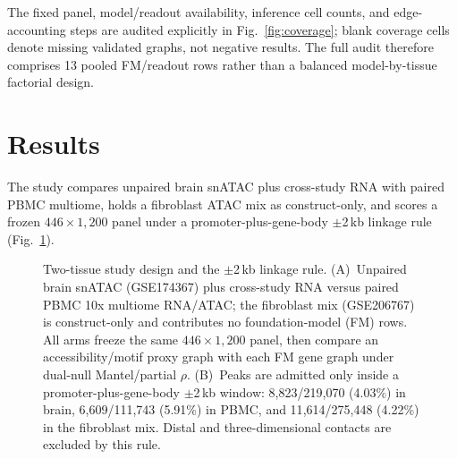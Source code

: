 \documentclass[fleqn,10pt,lineno]{wlpeerj}
\newcommand{\fitfig}[1]{\resizebox{\ifdim\width>\linewidth\linewidth\else\width\fi}{!}{#1}}
\begin{document}
The fixed panel, model/readout availability, inference cell counts, and edge-accounting
steps are audited explicitly in Fig.~\ref{fig:coverage}; blank coverage cells denote missing
validated graphs, not negative results. The full audit therefore comprises 13 pooled FM/readout
rows rather than a balanced model-by-tissue factorial design.

\section{Results}\label{sec:results}
The study compares unpaired brain snATAC plus cross-study RNA with paired PBMC multiome, holds a
fibroblast ATAC mix as construct-only, and scores a frozen $446\times 1{,}200$ panel under a
promoter-plus-gene-body $\pm$2\,kb linkage rule (Fig.~\ref{fig:study}).

\begin{figure}[!tbp]\centering
\fitfig{}
\caption{Two-tissue study design and the $\pm$2\,kb linkage rule. (A)~Unpaired brain snATAC
(GSE174367) plus cross-study RNA versus paired PBMC 10x multiome RNA/ATAC; the fibroblast mix
(GSE206767) is construct-only and contributes no foundation-model (FM) rows. All arms freeze the
same $446\times 1{,}200$ panel, then compare an accessibility/motif proxy graph with each FM gene
graph under dual-null Mantel/partial $\rho$. (B)~Peaks are admitted only inside a
promoter-plus-gene-body $\pm$2\,kb window: 8{,}823/219{,}070 (4.03\%) in brain, 6{,}609/111{,}743
(5.91\%) in PBMC, and 11{,}614/275{,}448 (4.22\%) in the fibroblast mix. Distal and
three-dimensional contacts are excluded by this rule.}\label{fig:study}
\end{figure}
\end{document}
